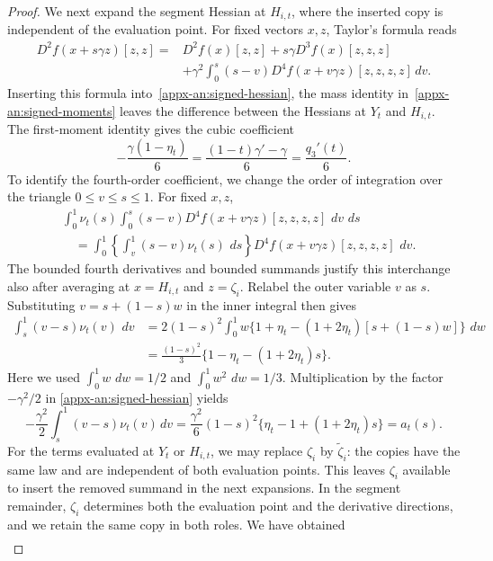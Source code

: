 \documentclass[11pt,letterpaper]{article}
\theoremstyle{remark}
\newcommand{\dd}{\,d}
\begin{document}
\begin{proof}
We next expand the segment Hessian at \(H_{i,t}\), where the
inserted copy is independent of the evaluation point. For fixed
vectors \(x,z\), Taylor's formula reads
\[
 \begin{aligned}
 D^2f(x+s\gamma z)[z,z]
 ={}&D^2f(x)[z,z]+s\gamma D^3f(x)[z,z,z]\\
 &+\gamma^2\int_0^s(s-v)
           D^4f(x+v\gamma z)[z,z,z,z]\dd v.
 \end{aligned}
\]
Inserting this formula into~\eqref{appx-an:signed-hessian},
the mass identity in~\eqref{appx-an:signed-moments} leaves the
difference between the Hessians at \(Y_t\) and \(H_{i,t}\).
The first-moment identity gives the cubic coefficient
\[
 -\frac{\gamma(1-\eta_t)}6
 =\frac{(1-t)\gamma'-\gamma}{6}
 =\frac{q_3'(t)}6.
\]
To identify the fourth-order coefficient, we change the order of
integration over the triangle $0\le v\le s\le1$. For fixed $x,z$,
\[
 \begin{aligned}
 &\int_0^1\nu_t(s)\int_0^s(s-v)
       D^4f(x+v\gamma z)[z,z,z,z]\,\dd v\,\dd s\\
 &\quad=\int_0^1
       \left\{\int_v^1(s-v)\nu_t(s)\,\dd s\right\}
       D^4f(x+v\gamma z)[z,z,z,z]\,\dd v.
 \end{aligned}
\]
The bounded fourth derivatives and bounded summands justify this
interchange also after averaging at $x=H_{i,t}$ and $z=\zeta_i$.
Relabel the outer variable $v$ as $s$. Substituting
$v=s+(1-s)w$ in the inner integral then gives
\[
 \begin{aligned}
 \int_s^1(v-s)\nu_t(v)\,\dd v
 &=2(1-s)^2\int_0^1
       w\{1+\eta_t-(1+2\eta_t)[s+(1-s)w]\}\,\dd w\\
 &=\frac{(1-s)^2}{3}
       \{1-\eta_t-(1+2\eta_t)s\}.
 \end{aligned}
\]
Here we used $\int_0^1w\,\dd w=1/2$ and
$\int_0^1w^2\,\dd w=1/3$.
Multiplication by the factor $-\gamma^2/2$ in
\eqref{appx-an:signed-hessian} yields
\[
 -\frac{\gamma^2}{2}\int_s^1(v-s)\nu_t(v)\dd v
 =\frac{\gamma^2}{6}(1-s)^2
       \{\eta_t-1+(1+2\eta_t)s\}
 =a_t(s).
\]
For the terms evaluated at \(Y_t\) or \(H_{i,t}\), we may replace
\(\zeta_i\) by \(\widetilde\zeta_i\): the copies have the same law
and are independent of both evaluation points. This leaves
\(\zeta_i\) available to insert the removed summand in the next
expansions. In the segment remainder, $\zeta_i$ determines both
the evaluation point and the derivative directions, and we retain
the same copy in both roles. We have obtained
\begin{equation}
 \begin{aligned}

\end{aligned}
\end{equation}
\end{proof}
\end{document}
